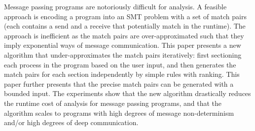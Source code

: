 Message passing programs are notoriously difficult for analysis. A feasible approach is encoding a program into an SMT problem with a set of match pairs (each contains a send and a receive that potentially match in the runtime). The approach is inefficient as the match pairs are over-approximated such that they imply exponential ways of message communication. This paper presents a new algorithm that under-approximates the match pairs iteratively: first sectioning each process in the program based on the user input, and then generates the match pairs for each section independently by simple rules with ranking. This paper further presents that the precise match pairs can be generated with a bounded input. The experiments show that the new algorithm drastically reduces the runtime cost of analysis for message passing programs, and that the algorithm scales to programs with high degrees of message non-determinism and/or high degrees of deep communication.